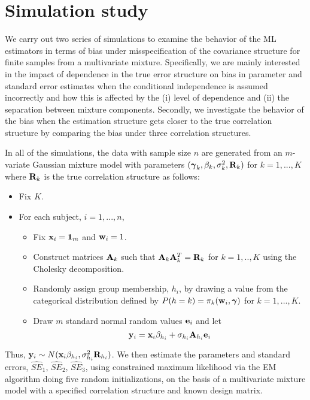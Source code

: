  \section{Simulation study}
We carry out two series of simulations to examine the behavior of the ML estimators in terms of bias under misspecification of the covariance structure for finite samples from a multivariate mixture. Specifically, we are mainly interested in the impact of dependence in the true error structure on bias in parameter and standard error estimates when the conditional independence is assumed incorrectly and how this is affected by the (i) level of dependence and (ii) the separation between mixture components. Secondly, we investigate the behavior of the bias when the estimation structure gets closer to the true correlation structure by comparing the bias under three correlation structures.

In all of the simulations, the data with sample size $n$ are generated from an $m$-variate Gaussian mixture model with parameters $(\boldsymbol\gamma_{k},\beta_{k},\sigma^{2}_{k},\mathbf R_k)$ for $k=1,...,K$ where $\mathbf R_k$ is the true correlation structure as follows:
\begin{itemize}
\item Fix $K$. 
\item For each subject, $i=1,...,n$, 
\begin{itemize}
\item Fix $\mathbf x_{i} = \mathbf 1_{m}$ and $\mathbf w_{i}=1$.
\item Construct matrices $\mathbf A_k$ such that $\mathbf A_k\mathbf A_k^{T}=\mathbf R_k$ for $k=1,..,K$ using the Cholesky decomposition. 
\item Randomly assign group membership, $h_{i}$, by drawing a value from the categorical distribution defined by $P(h=k)=\pi_{k}(\mathbf w_{i},\boldsymbol\gamma)$ for $k=1,...,K$. 
\item Draw $m$ standard normal random values $\mathbf e_{i}$ and let
$$\mathbf y_{i}=\mathbf x_{i}\beta_{h_{i}}+\sigma_{h_{i}}\mathbf A_{h_{i}}\mathbf e_{i}$$
\end{itemize}
\end{itemize}
Thus, $\mathbf y_{i}\sim N(\mathbf x_{i}\beta_{h_{i}},\sigma_{h_{i}}^{2}\mathbf R_{h_{i}})$. We then estimate the parameters and standard errors, $\widehat{SE}_1$, $\widehat{SE}_2$, $\widehat{SE}_3$, using constrained maximum likelihood via the EM algorithm \cite{hathaway1985} doing five random initializations, on the basis of a multivariate mixture model with a specified correlation structure and known design matrix.

